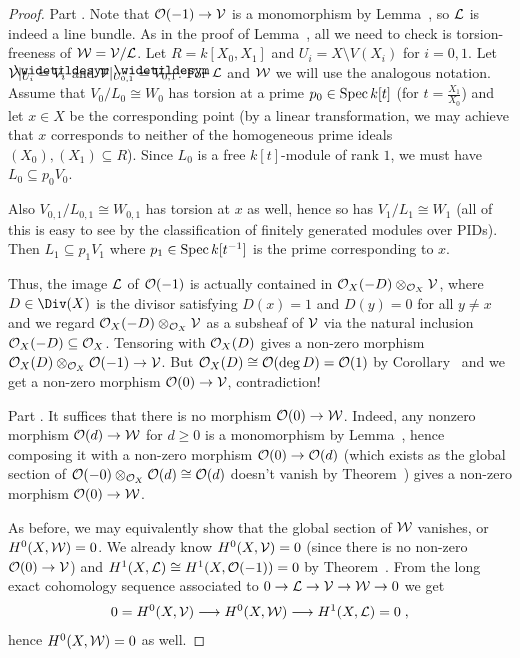 \documentclass[a4paper,parskip=half,numbers=enddot, DIV=12]{scrreprt}
\renewcommand{\geq}{\geqslant}
\begin{document}
\begin{proof}
	Part . Note that $\Oo(-1)\morphism\Vv$ is a monomorphism by Lemma~, so $\mathcal{L}$ is indeed a line bundle. As in the proof of Lemma~, all we need to check is torsion-freeness of $\mathcal{W}=\mathcal{V}/\mathcal{L}$. Let $R=k[X_0,X_1]$ and $U_i=X\setminus V(X_i)$ for $i=0,1$. Let $\Vv|_{U_i}=\snake{V}_i$ and $\Vv|_{U_{0,1}}=\snake{V}_{0,1}$. For $\mathcal{L}$ and $\mathcal{W}$ we will use the analogous notation. Assume that $V_0/L_0\cong W_0$ has torsion at a prime $p_0\in\operatorname{Spec} k[t]$ (for $t=\frac{X_1}{X_0}$) and let $x\in X$ be the corresponding point (by a linear transformation, we may achieve that $x$ corresponds to neither of the homogeneous prime ideals $(X_0),(X_1)\subseteq R$). Since $L_0$ is a free $k[t]$-module of rank $1$, we must have $L_0\subseteq p_0V_0$. 
	
	Also $V_{0,1}/L_{0,1}\cong W_{0,1}$ has torsion at $x$ as well, hence so has $V_1/L_1\cong W_1$ (all of this is easy to see by the classification of finitely generated modules over PIDs). Then $L_1\subseteq p_1V_1$ where $p_1\in\operatorname{Spec} k[t^{-1}]$ is the prime corresponding to $x$.
	
	Thus, the image $\mathcal{L}$ of $\mathcal{O}(-1)$ is actually contained in $\mathcal{O}_X(-D)\otimes_{\mathcal{O}_X}\mathcal{V}$, where $D\in\Div(X)$ is the divisor satisfying $D(x)=1$ and $D(y)=0$ for all $y\neq x$ and we regard $\mathcal{O}_X(-D)\otimes_{\mathcal{O}_X}\mathcal{V}$ as a subsheaf of $\mathcal{V}$ via the natural inclusion $\mathcal{O}_X(-D)\subseteq \mathcal{O}_X$. Tensoring with $\mathcal{O}_X(D)$ gives a non-zero morphism $\Oo_X(D)\otimes_{\Oo_X}\Oo(-1)\morphism\Vv$. But $\mathcal{O}_X(D)\cong \mathcal{O}(\deg D)=\mathcal{O}(1)$ by Corollary~ and we get a non-zero morphism $\Oo(0)\morphism\Vv$, contradiction!
	
	Part . It suffices that there is no morphism $\Oo(0)\morphism\Ww$. Indeed, any nonzero morphism $\Oo(d)\morphism\Ww$ for $d\geq 0$ is a monomorphism by Lemma~, hence composing it with a non-zero morphism $\Oo(0)\morphism\Oo(d)$ (which exists as the global section of $\mathcal{O}(-0)\otimes_{\mathcal{O}_X}\mathcal{O}(d)\cong \mathcal{O}(d)$ doesn't vanish by Theorem~) gives a non-zero morphism $\Oo(0)\morphism\Ww$. 
	
	As before, we may equivalently show that the global section of $\mathcal{W}$ vanishes, or $H^0(X,\mathcal{W})=0$. We already know $H^0(X,\mathcal{V})=0$ (since there is no non-zero $\Oo(0)\morphism\Vv$) and $H^1(X,\mathcal{L})\cong H^1(X,\mathcal{O}(-1))=0$ by Theorem~. From the long exact cohomology sequence associated to $0\morphism \Ll\morphism\Vv\morphism\Ww\morphism 0$ we get
	\begin{align*}
		0=H^0(X,\Vv)\morphism H^0(X,\Ww)\morphism H^1(X,\Ll)=0\;,
	\end{align*}
	hence $H^0(X,\mathcal{W})=0$ as well.
\end{proof}
\end{document}
